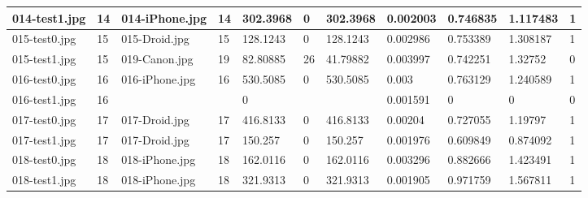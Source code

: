 \begin{landscape}
\begin{longtable}{|p{2cm}|p{1cm}|p{2cm}|p{1cm}|p{2cm}|p{1cm}|p{2cm}|p{2cm}|p{2cm}|p{2cm}|p{1cm}|}
		014-test1.jpg   & 14               & 014-iPhone.jpg        & 14                          & 302.3968              & 0                       & 302.3968                   & 0.002003              & 0.746835              & 1.117483                 & 1                \\ \hline
		015-test0.jpg   & 15               & 015-Droid.jpg         & 15                          & 128.1243              & 0                       & 128.1243                   & 0.002986              & 0.753389              & 1.308187                 & 1                \\ \hline
		015-test1.jpg   & 15               & 019-Canon.jpg         & 19                          & 82.80885              & 26                      & 41.79882                   & 0.003997              & 0.742251              & 1.32752                  & 0                \\ \hline
		016-test0.jpg   & 16               & 016-iPhone.jpg        & 16                          & 530.5085              & 0                       & 530.5085                   & 0.003                 & 0.763129              & 1.240589                 & 1                \\ \hline
		016-test1.jpg   & 16               &                       &                             & 0                     &                         &                            & 0.001591              & 0                     & 0                        & 0                \\ \hline
		017-test0.jpg   & 17               & 017-Droid.jpg         & 17                          & 416.8133              & 0                       & 416.8133                   & 0.00204               & 0.727055              & 1.19797                  & 1                \\ \hline
		017-test1.jpg   & 17               & 017-Droid.jpg         & 17                          & 150.257               & 0                       & 150.257                    & 0.001976              & 0.609849              & 0.874092                 & 1                \\ \hline
		018-test0.jpg   & 18               & 018-iPhone.jpg        & 18                          & 162.0116              & 0                       & 162.0116                   & 0.003296              & 0.882666              & 1.423491                 & 1                \\ \hline
		018-test1.jpg   & 18               & 018-iPhone.jpg        & 18                          & 321.9313              & 0                       & 321.9313                   & 0.001905              & 0.971759              & 1.567811                 & 1                \\ \hline

\end{longtable}
\end{landscape}

